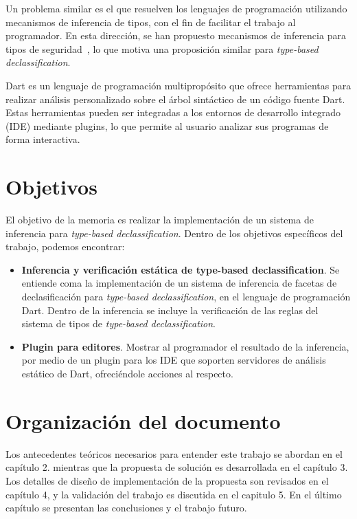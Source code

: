 \begin{intro}
	Un problema similar es el que resuelven los lenguajes de programación utilizando mecanismos de inferencia de tipos, con el fin de facilitar el trabajo al programador. En esta dirección, se han propuesto mecanismos de inferencia para tipos de seguridad~\cite{Pottier}, lo que motiva una proposición similar para \textit{type-based declassification}.

	Dart es un lenguaje de programación multipropósito que ofrece herramientas para realizar análisis personalizado sobre el árbol sintáctico de un código fuente Dart. Estas herramientas pueden ser integradas a los entornos de desarrollo integrado (IDE) mediante plugins, lo que permite al usuario analizar sus programas de forma interactiva.

	\section{Objetivos}
	El objetivo de la memoria es realizar la implementación de un sistema de inferencia para \textit{type-based declassification}. Dentro de los objetivos específicos del trabajo, podemos encontrar:

	\begin{itemize}
	\item \textbf{Inferencia y verificación estática de type-based declassification}. Se entiende coma la implementación de un sistema de inferencia de facetas de declasificación para \textit{type-based declassification}, en el lenguaje de programación Dart. Dentro de la inferencia se incluye la verificación de las reglas del sistema de tipos de \textit{type-based declassification}.

	\item \textbf{Plugin para editores}. Mostrar al programador el resultado de la inferencia, por medio de un plugin para los IDE que soporten servidores de análisis estático de Dart, ofreciéndole acciones al respecto.

	\end{itemize}

	\section{Organización del documento}

	Los antecedentes teóricos necesarios para entender este trabajo se abordan en el capítulo 2. mientras que la propuesta de solución es desarrollada en el capítulo 3. Los detalles de diseño de implementación de la propuesta son revisados en el capítulo 4, y la validación del trabajo es discutida en el capitulo 5. En el último capítulo se presentan las conclusiones y el trabajo futuro.

\end{intro}
